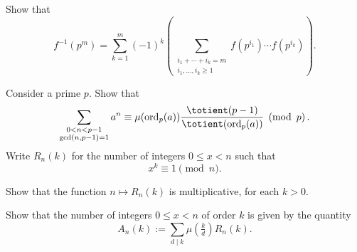 \begin{routine}
\begin{subexenum}
  \item Show that
    \begin{equation*}
      f^{-1}(p^m) = \sum_{k=1}^m (-1)^k\left(\sum_{\substack{i_1+\cdots +i_k=m\\ i_1,\ldots,i_k\geq 1}}f(p^{i_1})\cdots f(p^{i_k})\right).
    \end{equation*}
  \end{subexenum}
  \exercise Consider a prime $p$. Show that
  \begin{equation*}
    \sum_{\substack{0<n<p-1\\\gcd(n,p-1)=1}}a^n\equiv\mu(\ord_p(a))\frac{\totient(p-1)}{\totient(\ord_p(a))}\pmod{p}.
  \end{equation*}
  \exercise Write $R_n(k)$ for the number of integers $0\leq x<n$ such that
  \begin{equation*}
    x^k\equiv 1\pmod{n}.
  \end{equation*}
  \begin{subexenum}
  \item Show that the function $n\mapsto R_n(k)$ is multiplicative, for each $k>0$.
  \item Show that the number of integers $0\leq x<n$ of order $k$ is given by the quantity
    \begin{equation*}
      A_n(k):=\sum_{d\mid k}\mu\left(\tfrac{k}{d}\right)R_n(k).
    \end{equation*}
  \end{subexenum}
\end{routine}

